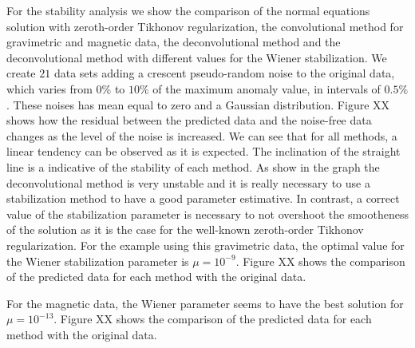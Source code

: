 For the stability analysis we show the comparison of the normal equations solution with zeroth-order Tikhonov regularization, the convolutional method for gravimetric and magnetic data, the deconvolutional method and the deconvolutional method with different values for the Wiener stabilization. We create $21$ data sets adding a crescent pseudo-random noise to the original data, which varies from $0\%$ to $10\%$ of the maximum anomaly value, in intervals of $0.5\%$. These noises has mean equal to zero and a Gaussian distribution.
Figure XX shows how the residual between the predicted data and the noise-free data changes as the level of the noise is increased. We can see that for all methods, a linear tendency can be observed as it is expected. The inclination of the straight line is a indicative of the stability of each method. As show in the graph the deconvolutional method is very unstable and it is really necessary to use a stabilization method to have a good parameter estimative. In contrast, a correct value of the stabilization parameter is necessary to not overshoot the smootheness of the solution as it is the case for the well-known zeroth-order Tikhonov regularization. For the example using this gravimetric data, the optimal value for the Wiener stabilization parameter is $\mu = 10^{-9}$. Figure XX shows the comparison of the predicted data for each method with the original data.

For the magnetic data, the Wiener parameter seems to have the best solution for $\mu = 10^{-13}$. Figure XX shows the comparison of the predicted data for each method with the original data.
